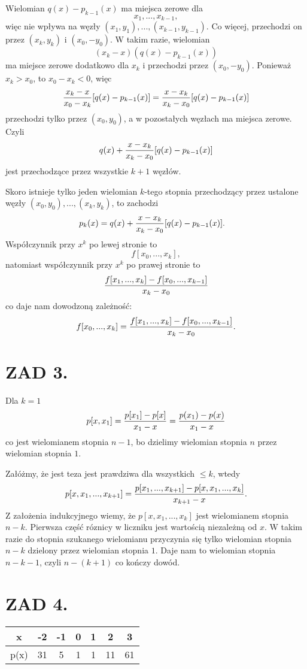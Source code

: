 \documentclass{article}[16pt]
\begin{document}
Wielomian $q(x)-p_{k-1}(x)$ ma miejsca zerowe dla 
$$x_1,...,x_{k-1},$$ 
więc nie wpływa na węzły $(x_1,y_1),...,(x_{k-1},y_{k-1})$. Co więcej, przechodzi on przez $(x_k,y_k)$ i $(x_0, -y_0)$. W takim razie, wielomian 
$$(x_k-x)(q(x)-p_{k-1}(x))$$ 
ma miejsce zerowe dodatkowo dla $x_k$ i przechodzi przez $(x_0,-y_0)$. Ponieważ $x_k>x_0$, to $x_0-x_k<0$, więc
$${x_k-x\over x_0-x_k}[q(x)-p_{k-1}(x)]={x-x_k\over x_k-x_0}[q(x)-p_{k-1}(x)]$$
przechodzi tylko przez $(x_0,y_0)$, a w pozostałych węzłach ma miejsca zerowe. Czyli
$$q(x)+{x-x_k\over x_k-x_0}[q(x)-p_{k-1}(x)]$$
jest przechodzące przez wszystkie $k+1$ węzłów.
\medskip

Skoro istnieje tylko jeden wielomian $k$-tego stopnia przechodzący przez ustalone węzły $(x_0,y_0),...,(x_k,y_k)$, to zachodzi
\begin{align*}
    p_k(x)&=q(x)+{x-x_k\over x_k-x_0}[q(x)-p_{k-1}(x)].
\end{align*}
Współczynnik przy $x^k$ po lewej stronie to
$$f[x_0,...,x_k],$$
natomiast współczynnik przy $x^k$ po prawej stronie to
$${f[x_1,...,x_k]-f[x_0,...,x_{k-1}]\over x_k-x_0}$$
co daje nam dowodzoną zależność:
$$f[x_0,...,x_k]={f[x_1,...,x_k]-f[x_0,...,x_{k-1}]\over x_k-x_0}.$$

\section*{ZAD 3.}

    Dla $k=1$
    $$p[x, x_1]={p[x_1]-p[x]\over x_1-x}={p(x_1)-p(x)\over x_1-x}$$
    co jest wielomianem stopnia $n-1$, bo dzielimy wielomian stopnia $n$ przez wielomian stopnia $1$.
    \smallskip

    Załóżmy, że jest teza jest prawdziwa dla wszystkich $\leq k$, wtedy
    $$p[x, x_1,...,x_{k+1}]={p[x_1, ..., x_{k+1}]-p[x, x_1,...,x_k]\over x_{k+1}-x}.$$
    Z założenia indukcyjnego wiemy, że $p[x, x_1, ..., x_k]$ jest wielomianem stopnia $n-k$. Pierwsza część róznicy w liczniku jest wartością niezależną od $x$. W takim razie do stopnia szukanego wielomianu przyczynia się tylko wielomian stopnia $n-k$ dzielony przez wielomian stopnia $1$. Daje nam to wielomian stopnia $n-k-1$, czyli $n-(k+1)$ co kończy dowód.

\section*{ZAD 4.}

\begin{center}\begin{tabular}{ | c | c | c | c | c | c | c |}
    \hline

    x & -2 & -1 & 0 & 1 & 2 & 3\\

    \hline

    p(x) & 31 & 5 & 1 & 1 & 11 & 61\\

    \hline
\end{tabular}\end{center}
\end{document}
